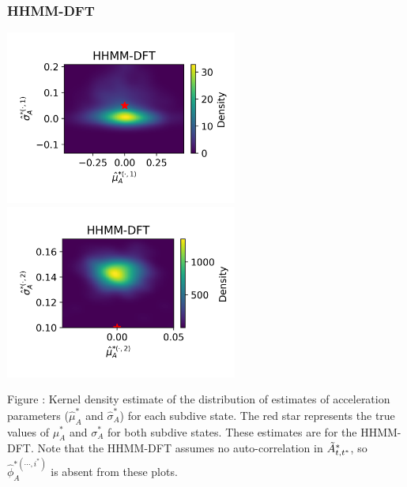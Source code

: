\documentclass{article}
\begin{document}
        \subsubsection{HHMM-DFT}
        \begin{center}
        \includegraphics[width=3in]{../Plots/hhmm_FV_uncorr_MLE_density_A_0_0.png}
        \includegraphics[width=3in]{../Plots/hhmm_FV_uncorr_MLE_density_A_0_1.png}
        \end{center}
        
        \noindent Figure : Kernel density estimate of the distribution of estimates of acceleration parameters ($\hat \mu^*_A$ and $\hat \sigma^*_A$) for each subdive state. The red star represents the true values of $\mu^*_A$ and $\sigma^*_A$ for both subdive states. These estimates are for the HHMM-DFT. Note that the HHMM-DFT assumes no auto-correlation in $\tilde{A}^*_{t,t^*}$, so $\hat \phi_A^{*(\cdots,i^*)}$ is absent from these plots.
        \addtocounter{fignum}{1}
        
\end{document}
